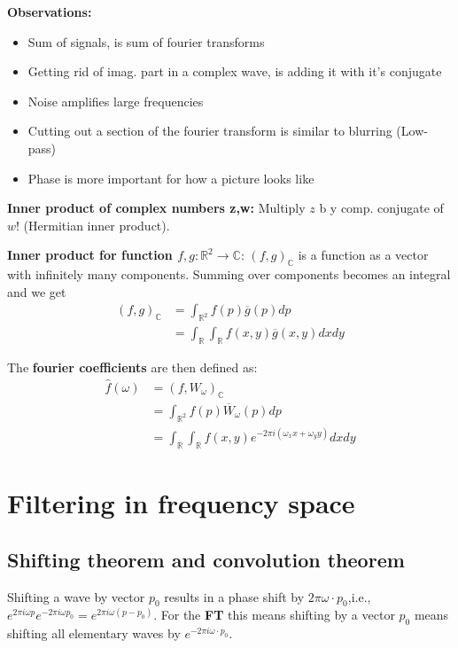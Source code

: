 \textbf{Observations:}

\begin{itemize}
    \item Sum of signals, is sum of fourier transforms
    \item Getting rid of imag. part in a complex wave, is adding it with it's conjugate
    \item Noise amplifies large frequencies
    \item Cutting out a section of the fourier transform is similar to blurring (Low-pass)
    \item Phase is more important for how a picture looks like
\end{itemize}

\textbf{Inner product of complex numbers z,w:} Multiply $z$ b y comp. conjugate of $w$! (Hermitian inner product).

\textbf{Inner product for function $f,g: \mathbb{R}^2 \rightarrow \mathbb{C}$}: $(f,g)_{\mathbb{C}}$ is a function as a vector with infinitely many components. Summing over components becomes an integral and we get 
\begin{align*}
    (f,g)_{\mathbb{C}} & = \int_{\mathbb{R}^2} f(p) \overline{g}(p) dp \\
    & = \int_{\mathbb{R}}\int_{\mathbb{R}} f(x,y) \overline{g}(x,y) dx dy
\end{align*}

The \textbf{fourier coefficients} are then defined as:
\begin{align*}
    \hat{f}(\omega) & = (f,W_\omega)_{\mathbb{C}}\\
    & = \int_{\mathbb{R}^2} f(p) \overline{W}_\omega(p) dp \\
    & = \int_{\mathbb{R}}\int_{\mathbb{R}} f(x,y) e^{-2\pi i(\omega_x x + \omega_y y)} dx dy
\end{align*}

\section{Filtering in frequency space}

\subsection{Shifting theorem and convolution theorem}

Shifting a wave by vector $p_0$ results in a phase shift by $2\pi \omega \cdot p_0$,i.e., $e^{2\pi i \omega p} e^{-2\pi i \omega p_0} = e^{2\pi i \omega (p-p_0)}$. For the \textbf{FT} this means shifting by a vector $p_0$ means shifting all elementary waves by $e^{-2\pi i \omega \cdot p_0}$.

